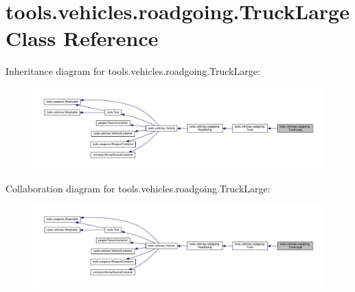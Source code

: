 \hypertarget{classtools_1_1vehicles_1_1roadgoing_1_1_truck_large}{}\section{tools.\+vehicles.\+roadgoing.\+Truck\+Large Class Reference}
\label{classtools_1_1vehicles_1_1roadgoing_1_1_truck_large}


Inheritance diagram for tools.\+vehicles.\+roadgoing.\+Truck\+Large\+:
\nopagebreak
\begin{figure}[H]
\begin{center}
\leavevmode
\includegraphics[width=350pt]{classtools_1_1vehicles_1_1roadgoing_1_1_truck_large__inherit__graph}
\end{center}
\end{figure}


Collaboration diagram for tools.\+vehicles.\+roadgoing.\+Truck\+Large\+:
\nopagebreak
\begin{figure}[H]
\begin{center}
\leavevmode
\includegraphics[width=350pt]{classtools_1_1vehicles_1_1roadgoing_1_1_truck_large__coll__graph}
\end{center}
\end{figure}
